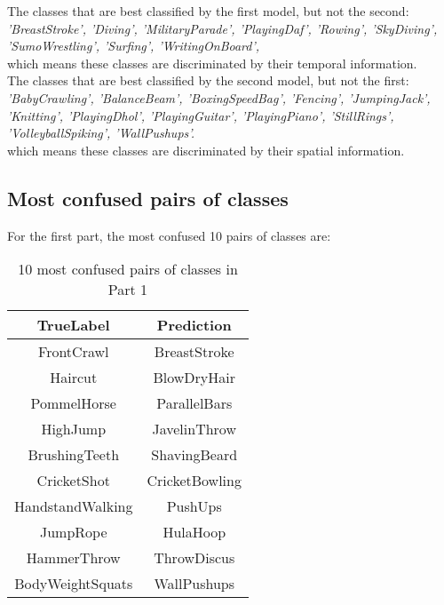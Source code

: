 \documentclass[15pt]{article}
\begin{document}
The classes that are best classified by the first model, but not the second:\\
\emph{'BreastStroke', 'Diving', 'MilitaryParade', 'PlayingDaf', 'Rowing', 'SkyDiving', 'SumoWrestling', 'Surfing', 'WritingOnBoard',}\\
which means these classes are discriminated by their temporal information.\\

The classes that are best classified by the second model, but not the first:\\
\emph{'BabyCrawling', 'BalanceBeam', 'BoxingSpeedBag', 'Fencing', 'JumpingJack', 'Knitting', 'PlayingDhol', 'PlayingGuitar', 'PlayingPiano', 'StillRings', 'VolleyballSpiking', 'WallPushups'.}\\
which means these classes are discriminated by their spatial information.

\subsection{Most confused pairs of classes}
For the first part, the most confused 10 pairs of classes are: \\
\begin{table}[!hbp]
\begin{center}
\begin{tabular}{c|c}
TrueLabel & Prediction \\
\hline
FrontCrawl & BreastStroke \\
Haircut & BlowDryHair \\
PommelHorse & ParallelBars \\
HighJump & JavelinThrow \\
BrushingTeeth & ShavingBeard \\
CricketShot & CricketBowling \\
HandstandWalking & PushUps \\
JumpRope & HulaHoop \\
HammerThrow & ThrowDiscus \\
BodyWeightSquats & WallPushups\\
\hline
\end{tabular}
\end{center}
\caption{10 most confused pairs of classes in Part 1}
\end{table}
\end{document}
